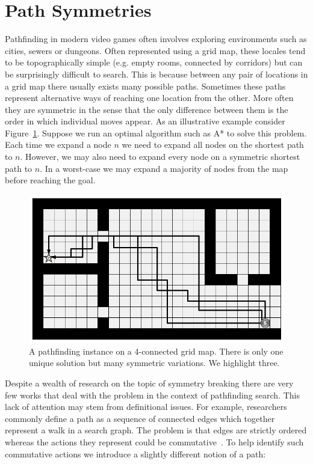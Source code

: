 \section{Path Symmetries}
Pathfinding in modern video games often involves exploring 
environments such as cities, sewers or dungeons. Often represented using a
grid map, these locales tend to be topographically simple (e.g. empty rooms, 
connected by corridors) but can be surprisingly difficult to search. 
This is because between any pair of locations in a grid map 
there usually exists many possible paths. Sometimes these paths represent 
alternative ways of reaching one location from the other. More often they 
are symmetric in the sense that the only difference between them is the order
in which individual moves appear. 
As an illustrative example consider Figure~\ref{fig::rsr::symmetry}. 
Suppose we run an optimal algorithm such as A* to solve this problem. Each time 
we expand a node $n$ we need to expand all nodes on the shortest path to $n$. 
However, we may also need to expand every node on a symmetric shortest path to $n$.
In a worst-case we may expand a majority of nodes from the map before reaching
the goal.

\begin{figure}[tb]
\begin{center}
\includegraphics[scale=0.30, trim = 10mm 10mm 10mm 0mm]{chapter_rsr/diagrams/symmetry.png}
\end{center}
\vspace{-3pt}
\caption{A pathfinding instance on a 4-connected grid map. There is only 
one unique solution but many symmetric variations. We highlight three.}
\label{fig::rsr::symmetry}
\end{figure}

Despite a wealth of research on the topic of symmetry breaking there are very 
few works that deal with the problem in the context of pathfinding search. 
This lack of attention may stem from definitional issues. For example, researchers commonly
define a path as a sequence of connected edges which together represent a walk in 
a search graph.
The problem is that edges are strictly ordered whereas the actions they
represent could be commutative~\citep{haslum00}. To help identify such commutative actions
we introduce a slightly different notion of a path:

